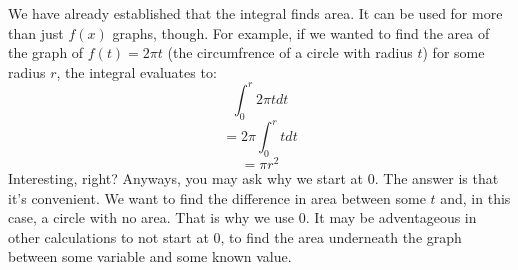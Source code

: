 \documentclass[../revisedmain.tex]{subfiles}
\begin{document}
We have already established that the integral finds area. It can be used for more than just $f(x)$ graphs, though. For example, if we wanted to find the area of the graph of $f(t)=2\pi t$ (the circumfrence of a circle with radius $t$) for some radius $r$, the integral evaluates to:$$\int_{0}^{r} 2\pi t dt$$$$=2\pi\int_{0}^{r} t dt$$$$=\pi r^2$$Interesting, right? Anyways, you may ask why we start at 0. The answer is that it's convenient. We want to find the difference in area between some $t$ and, in this case, a circle with no area. That is why we use 0. It may be adventageous in other calculations to not start at 0, to find the area underneath the graph between some variable and some known value.
\end{document}
